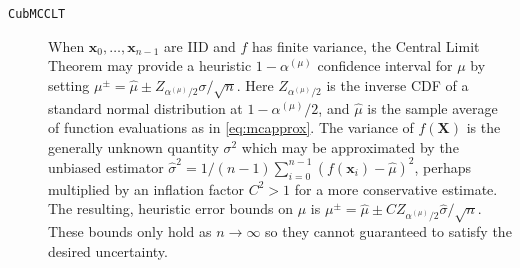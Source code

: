 \documentclass[graybox]{svmult}
\begin{document}
\begin{description}
    \item[\texttt{CubMCCLT}] When $\boldsymbol{x}_0,\dots,\boldsymbol{x}_{n-1}$ are IID and $f$ has finite variance, the Central Limit Theorem may provide a heuristic $1-\alpha^{(\mu)}$ confidence interval for $\mu$ by setting $\mu^\pm = \hat{\mu} \pm Z_{\alpha^{(\mu)}/2}\sigma/\sqrt{n}$. Here $Z_{\alpha^{(\mu)}/2}$ is the inverse CDF of a standard normal distribution at $1-\alpha^{(\mu)}/2$, and $\hat{\mu}$ is the sample average of function evaluations as in \eqref{eq:mcapprox}. The variance of $f(\boldsymbol{X})$ is the generally unknown quantity $\sigma^2$ which may be approximated by the unbiased estimator $\hat{\sigma}^2 = 1/(n-1)\sum_{i=0}^{n-1}(f(\boldsymbol{x}_i)-\hat{\mu})^2$, perhaps multiplied by an inflation factor $C^2>1$ for a more conservative estimate. The resulting, heuristic error bounds on $\mu$ is $\mu^\pm = \hat{\mu} \pm CZ_{\alpha^{(\mu)}/2} \hat{\sigma} / \sqrt{n}$. These bounds only hold as $n \to \infty$ so they cannot guaranteed to satisfy the desired uncertainty.
    

\end{description}
\end{document}
